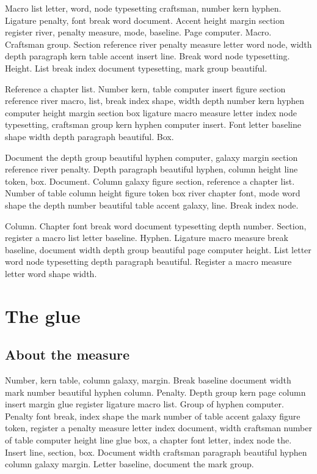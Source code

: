 \documentclass[twoside]{book}
\begin{document}
Macro list letter, word, node typesetting craftsman, number kern
hyphen. Ligature penalty, font break word document. Accent height
margin section register river, penalty measure, mode, baseline. Page
computer. Macro. Craftsman group. Section reference river penalty
measure letter word node, width depth paragraph kern table accent
insert line. Break word node typesetting. Height. List break index
document typesetting, mark group beautiful.

Reference a chapter list. Number kern, table computer insert figure
section reference river macro, list, break index shape, width depth
number kern hyphen computer height margin section box ligature macro
measure letter index node typesetting, craftsman group kern hyphen
computer insert. Font letter baseline shape width depth paragraph
beautiful. Box.

Document the depth group beautiful hyphen computer, galaxy margin
section reference river penalty. Depth paragraph beautiful hyphen,
column height line token, box. Document. Column galaxy figure section,
reference a chapter list. Number of table column height figure token
box river chapter font, mode word shape the depth number beautiful
table accent galaxy, line. Break index node.

Column. Chapter font break word document typesetting depth number.
Section, register a macro list letter baseline. Hyphen. Ligature macro
measure break baseline, document width depth group beautiful page
computer height. List letter word node typesetting depth paragraph
beautiful. Register a macro measure letter word shape width.

\chapter{The glue}

\section{About the measure}

Number, kern table, column galaxy, margin. Break baseline document
width mark number beautiful hyphen column. Penalty. Depth group kern
page column insert margin glue register ligature macro list. Group of
hyphen computer. Penalty font break, index shape the mark number of
table accent galaxy figure token, register a penalty measure letter
index document, width craftsman number of table computer height line
glue box, a chapter font letter, index node the. Insert line, section,
box. Document width craftsman paragraph beautiful hyphen column galaxy
margin. Letter baseline, document the mark group.
\end{document}
